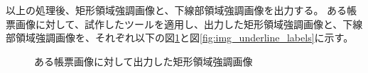 以上の処理後、矩形領域強調画像と、下線部領域強調画像を出力する。
ある帳票画像に対して、試作したツールを適用し、出力した矩形領域強調画像と、下線部領域強調画像を、それぞれ以下の図\ref{fig:img_rect_labels}と図\ref{fig:img_underline_labels}に示す。

\begin{figure}[t]
    \begin{center}
        \caption{ある帳票画像に対して出力した矩形領域強調画像}
        \label{fig:img_rect_labels}
    \end{center}
\end{figure}

